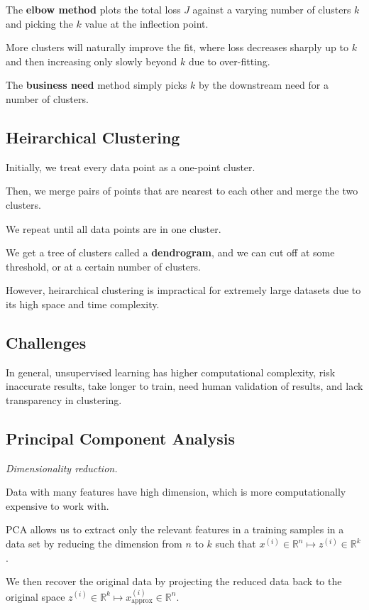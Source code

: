 The \textbf{elbow method} plots the total loss $J$ against a varying number of clusters $k$ and
picking the $k$ value at the inflection point.

More clusters will naturally improve the fit, where loss decreases sharply up to $k$ and then
increasing only slowly beyond $k$ due to over-fitting.

The \textbf{business need} method simply picks $k$ by the downstream need for a number of clusters.

\subsection{Heirarchical Clustering}

Initially, we treat every data point as a one-point cluster.

Then, we merge pairs of points that are nearest to each other and merge the two clusters.

We repeat until all data points are in one cluster.

We get a tree of clusters called a \textbf{dendrogram}, and we can cut off at some
threshold, or at a certain number of clusters.

However, heirarchical clustering is impractical for extremely large datasets due to its
high space and time complexity.

\subsection{Challenges}
In general, unsupervised learning has higher computational complexity,
risk inaccurate results, take longer to train, need human validation of results,
and lack transparency in clustering.

\subsection{Principal Component Analysis}
\emph{Dimensionality reduction.}

Data with many features have high dimension, which is more computationally expensive to work with.

PCA allows us to extract only the relevant features in a training samples in a data set by
reducing the dimension from $n$ to $k$ such that $x^{(i)} \in \mathbb{R}^n \mapsto z^{(i)} \in \mathbb{R}^k$.

We then recover the original data by projecting the reduced data back to the original space
$z^{(i)} \in \mathbb{R}^k \mapsto x^{(i)}_{\text{approx}} \in \mathbb{R}^n$.

